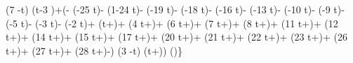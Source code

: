   \theta (7 \pi -t) \theta (t-3 \pi )+\left(- \sin \left(-25
   t\right)- \sin (1-24 t)- \sin \left(-19
   t\right)- \sin \left(-18 t\right)- \sin
   \left(-16 t\right)- \sin \left(-13
   t\right)- \sin \left(-10 t\right)- \sin
   \left(-9 t\right)- \sin \left(-5
   t\right)- \sin \left(-3 t\right)- \sin
   \left(-2 t\right)+ \sin \left(t+\right)+
   \sin \left(4 t+\right)+ \sin \left(6
   t+\right)+ \sin \left(7 t+\right)+ \sin
   \left(8 t+\right)+ \sin \left(11 t+\right)+
   \sin \left(12 t+\right)+ \sin \left(14
   t+\right)+ \sin \left(15 t+\right)+ \sin
   \left(17 t+\right)+ \sin \left(20
   t+\right)+ \sin \left(21 t+\right)+ \sin
   \left(22 t+\right)+ \sin \left(23
   t+\right)+ \sin \left(26 t+\right)+ \sin
   \left(27 t+\right)+ \sin \left(28
   t+\right)-\right) \theta (3 \pi -t) \theta (t+\pi )\right) \theta
   \left(\right)\right\}